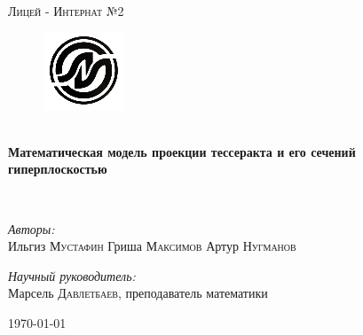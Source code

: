 \begin{titlepage}
\begin{center}
\textsc{\LARGE Лицей - Интернат №2}\\[1.5cm]

\begin{figure}
	\center
	\includegraphics[scale=0.8]{./li.png}
	\clearpage
\end{figure}


\selectfont
\HRule \\[0.4cm]
{ \huge \bfseries Математическая модель проекции тессеракта и его сечений гиперплоскостью\\[0.4cm] }

\HRule \\[1.5cm]

\noindent

\begin{minipage}{0.4\textwidth}
\begin{flushleft} \large
\emph{Авторы:}\\
Ильгиз \textsc{Мустафин} \newline
Гриша \textsc{Максимов} \newline %
Артур \textsc{Нугманов} 
\end{flushleft}

\end{minipage}%
\begin{minipage}{0.4\textwidth}
\begin{flushright} \large
\emph{Научный руководитель:} \\
Марсель \textsc{Давлетбаев}, преподаватель математики
\end{flushright}
\end{minipage}

\vfill

{\large \today}

\end{center}
\end{titlepage}

